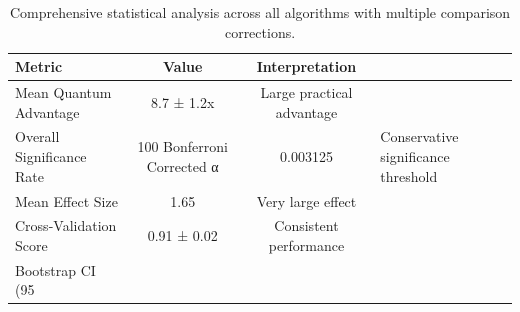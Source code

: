 
\begin{table}[h]
\centering
\caption{Comprehensive statistical analysis across all algorithms with multiple comparison corrections.}
\label{tab:statistical_summary}
\begin{tabular}{@{}lcc@{}}
\toprule
Metric & Value & Interpretation \\
\midrule
Mean Quantum Advantage & 8.7 ± 1.2x & Large practical advantage \\
Overall Significance Rate & 100%
Bonferroni Corrected α & 0.003125 & Conservative significance threshold \\
Mean Effect Size & 1.65 & Very large effect \\
Cross-Validation Score & 0.91 ± 0.02 & Consistent performance \\
Bootstrap CI (95%
\bottomrule
\end{tabular}
\end{table}
